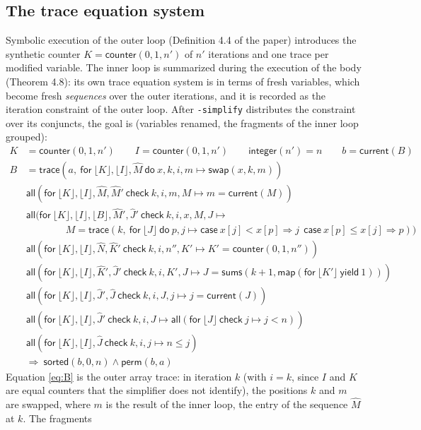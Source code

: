 \documentclass[11pt,a4paper]{article}
\newcommand{\bl}[1]{\lfloor #1\rfloor}                       %
\newcommand{\tr}[3]{\mathsf{trace}(#1,\ \mathsf{for}\ #2\ \mathsf{do}\ #3)}
\newcommand{\mapc}[2]{\mathsf{map}(\mathsf{for}\ #1\ \mathsf{yield}\ #2)}
\newcommand{\al}[2]{\mathsf{all}(\mathsf{for}\ #1\ \mathsf{check}\ #2)}
\newcommand{\cnt}{\mathsf{counter}}
\newcommand{\cur}{\mathsf{current}}
\newcommand{\intf}{\mathsf{integer}}
\newcommand{\sums}{\mathsf{sums}}
\newcommand{\sorted}{\mathsf{sorted}}
\newcommand{\perm}{\mathsf{perm}}
\newcommand{\swap}[3]{\mathsf{swap}(#1, #2, #3)}
\newcommand{\upd}[2]{\mathsf{case}\ #1 \Rightarrow #2}
\newcommand{\seq}[1]{\hat{#1}}                               %
\begin{document}
\subsection{The trace equation system}

Symbolic execution of the outer loop (Definition 4.4 of the paper) introduces the synthetic counter
$K = \cnt(0, 1, n')$ of $n'$ iterations and one trace per modified variable. The inner loop is
summarized during the execution of the body (Theorem 4.8): its own trace equation system is in terms of
fresh variables, which become fresh \emph{sequences} over the outer iterations, and it is recorded as the
iteration constraint of the outer loop. After \texttt{-simplify} distributes the constraint over its
conjuncts, the goal is (variables renamed, the fragments of the inner loop grouped):
\begin{align}
  K &= \cnt(0, 1, n') \qquad I = \cnt(0, 1, n') \qquad \intf(n') = n \qquad b = \cur(B) \label{eq:outer}\\
  B &= \tr{a}{\bl{K}, \bl{I}, \seq{M}}{x, k, i, m \mapsto \swap{x}{k}{m}} \label{eq:B}\\[2pt]
  &\al{\bl{K}, \bl{I}, \seq{M}, \seq{M}'}{k, i, m, M \mapsto m = \cur(M)} \label{eq:f1}\\
  &\al{\bl{K}, \bl{I}, \bl{B}, \seq{M}', \seq{J}'}{k, i, x, M, J \mapsto {} \nonumber\\
  &\qquad\qquad M = \tr{k}{\bl{J}}{p, j \mapsto \upd{x[j] < x[p]}{j}\ \ \upd{x[p] \le x[j]}{p}}} \label{eq:f2}\\
  &\al{\bl{K}, \bl{I}, \seq{N}, \seq{K}'}{k, i, n'', K' \mapsto K' = \cnt(0, 1, n'')} \label{eq:f3}\\
  &\al{\bl{K}, \bl{I}, \seq{K}', \seq{J}'}{k, i, K', J \mapsto J = \sums(k + 1, \mapc{\bl{K'}}{1})} \label{eq:f4}\\
  &\al{\bl{K}, \bl{I}, \seq{J}', \seq{J}}{k, i, J, j \mapsto j = \cur(J)} \label{eq:f5}\\
  &\al{\bl{K}, \bl{I}, \seq{J}'}{k, i, J \mapsto \al{\bl{J}}{j \mapsto j < n}} \label{eq:f6}\\
  &\al{\bl{K}, \bl{I}, \seq{J}}{k, i, j \mapsto n \le j} \label{eq:f7}\\[2pt]
  &\Longrightarrow\ \sorted(b, 0, n) \wedge \perm(b, a) \nonumber
\end{align}
Equation \eqref{eq:B} is the outer array trace: in iteration $k$ (with $i = k$, since $I$ and $K$ are
equal counters that the simplifier does not identify), the positions $k$ and $m$ are swapped, where $m$ is
the result of the inner loop, the entry of the sequence $\seq{M}$ at $k$. The fragments
\end{document}
